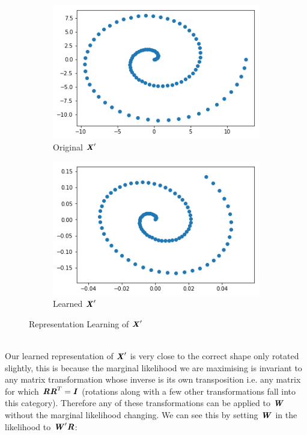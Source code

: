 \documentclass{article}
\newcommand{\mat}[1]{\textbf{\textit{#1}}}
\begin{document}
\begin{figure}[h!]
	\centering
	\begin{subfigure}[t]{0.4\linewidth}
		\includegraphics[width=\linewidth]{oldX}
		\caption{Original $\mat{X}^\prime$}
		\label{fig:oldX}
	\end{subfigure}
	\begin{subfigure}[t]{0.4\linewidth}
		\includegraphics[width=\linewidth]{newX}
		\caption{Learned $\mat{X}^\prime$}
		\label{fig:newX}
	\end{subfigure}
	\caption{Representation Learning of $\mat{X}^\prime$}
\end{figure} \\
Our learned representation of $\mat{X}^\prime$ is very close to the correct shape only rotated slightly, this is because the marginal likelihood we are maximising is invariant to any matrix transformation whose inverse is its own transposition i.e. any matrix for which $\mat{R}\mat{R}^T = \mat{I}$ (rotations along with a few other transformations fall into this category). Therefore any of these transformations can be applied to $\mat{W}$ without the marginal likelihood changing. We can see this by setting $\mat{W}$ in the likelihood to $\mat{W}^\prime\mat{R}$:
\end{document}
